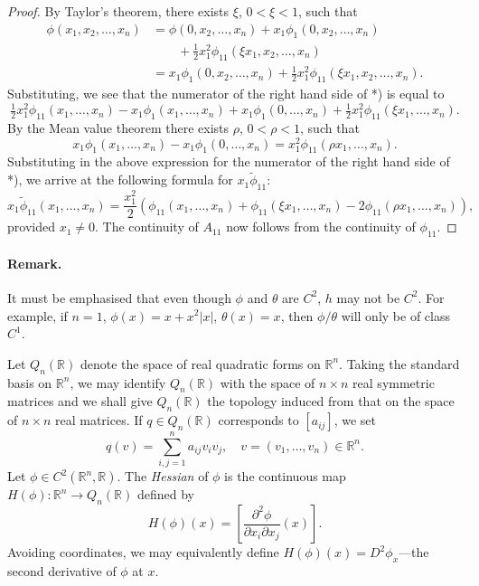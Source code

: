 \begin{proof}
By Taylor's theorem, there exists $\xi$, $0<\xi<1$, such that
\begin{align*}
\phi(x_1,x_2,\ldots,x_n)&=\phi(0,x_2,\ldots,x_n)+x_1\phi_1(0,x_2,\ldots,x_n)\\
&\qquad+\tfrac12 x_1^2\phi_{11}(\xi x_1,x_2,\ldots,x_n)\\
&=x_1\phi_1(0,x_2,\ldots,x_n)+\tfrac12 x_1^2\phi_{11}(\xi x_1,x_2,\ldots,x_n).
\end{align*}
Substituting, we see that the numerator of the right hand side of *) is equal to
\[\tfrac12 x_1^2\phi_{11}(x_1,\ldots,x_n)-x_1\phi_1(x_1,\ldots,x_n)+x_1\phi_1(0,\ldots,x_n)+\tfrac12 x_1^2\phi_{11}(\xi x_1,\ldots,x_n).\]
By the Mean value theorem there exists $\rho$, $0<\rho<1$, such that
\[x_1\phi_1(x_1,\ldots,x_n)-x_1\phi_1(0,\ldots,x_n)=x_1^2\phi_{11}(\rho x_1,\ldots,x_n).\]
Substituting in the above expression for the numerator of the right hand side of *), we arrive at the following formula for $x_1\widetilde\phi_{11}$:
\[x_1\widetilde\phi_{11}(x_1,\ldots,x_n)=\frac{x_1^2}{2}(\phi_{11}(x_1,\ldots,x_n)+\phi_{11}(\xi x_1,\ldots,x_n)-2\phi_{11}(\rho x_1,\ldots,x_n)),\]
provided $x_1\neq0$. The continuity of $A_{11}$ now follows from the continuity of $\phi_{11}$.
\end{proof}
\paragraph*{Remark.} It must be emphasised that even though $\phi$ and $\theta$ are $C^2$, $h$ may not be $C^2$. For example, if $n=1$, $\phi(x)=x+x^2|x|$, $\theta(x)=x$, then $\phi/\theta$ will only be of class $C^1$.

Let $Q_n(\mathbb R)$ denote the space of real quadratic forms on $\mathbb R^n$. Taking the standard basis on $\mathbb R^n$, we may identify $Q_n(\mathbb R)$ with the space of $n\times n$ real symmetric matrices and we shall give $Q_n(\mathbb R)$ the topology induced from that on the space of $n\times n$ real matrices. If $q\in Q_n(\mathbb R)$ corresponds to $[a_{ij}]$, we set
\[q(v)=\sum_{i,j=1}^n a_{ij}v_i v_j,\quad v=(v_1,\ldots,v_n)\in\mathbb R^n.\]
Let $\phi\in C^2(\mathbb R^n,\mathbb R)$. The \emph{Hessian} of $\phi$ is the continuous map $H(\phi):\mathbb R^n\to Q_n(\mathbb R)$ defined by
\[H(\phi)(x)=\left[\frac{\partial^2\phi}{\partial x_i\partial x_j}(x)\right].\]
Avoiding coordinates, we may equivalently define $H(\phi)(x)=D^2\phi_x$---the second derivative of $\phi$ at $x$.

